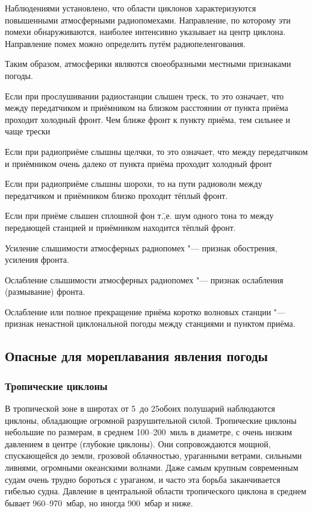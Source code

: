 Наблюдениями установлено, что области циклонов характеризуются
повышенными атмосферными радиопомехами. Направление, по которому эти
помехи обнаруживаются, наиболее интенсивно указывает на центр
циклона. Направление помех можно определить путём радиопеленгования.

Таким образом, атмосферики являются своеобразными местными признаками
погоды.

 Если при прослушивании радиостанции слышен треск, то это
означает, что между передатчиком и приёмником на близком расстоянии от
пункта приёма проходит холодный фронт. Чем ближе фронт к пункту
приёма, тем сильнее и чаще трески

 Если при радиоприёме слышны щелчки, то это означает, что между
передатчиком и приёмником очень далеко от пункта приёма проходит
холодный фронт

 Если при радиоприёме слышны шорохи, то на пути радиоволн между
передатчиком и приёмником близко проходит тёплый фронт.

 Если при приёме слышен сплошной фон т.\=,е. шум одного тона то
между передающей станцией и приёмником находится тёплый фронт.

 Усиление слышимости атмосферных радиопомех "--- признак
обострения, усиления фронта.

 Ослабление слышимости атмосферных радиопомех "--- признак
ослабления (размывание) фронта.

 Ослабление или полное прекращение приёма коротко волновых
станции "--- признак ненастной циклональной погоды между станциями и
пунктом приёма.

\subsection{Опасные для мореплавания явления погоды}

\subsubsection{Тропические циклоны}

В тропической зоне в широтах от 5~до 25\gr обоих полушарий наблюдаются
циклоны, обладающие огромной разрушительной силой. Тропические циклоны
небольшие по размерам, в среднем 100--200~миль в диаметре, с очень
низким давлением в центре (глубокие циклоны). Они сопровождаются
мощной, спускающейся до земли, грозовой облачностью, ураганными
ветрами, сильными ливнями, огромными океанскими волнами. Даже самым
крупным современным судам очень трудно бороться с ураганом, и часто
эта борьба заканчивается гибелью судна. Давление в центральной области
тропического циклона в среднем бывает 960--970~мбар, но иногда 900~мбар
и ниже.

